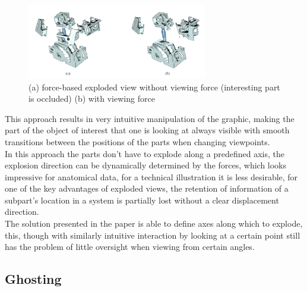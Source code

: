 \begin{figure}[tb]
	\centering
	\includegraphics[width=0.7\textwidth]{chapters/figures/motor}
	\caption{(a) force-based exploded view without viewing force (interesting part is occluded) (b) with viewing force\cite{proc:bruckner-2006-EVV}}
	\label{fig:motor}
\end{figure}
This approach results in very intuitive manipulation of the graphic, making the part of the object of interest that one is looking at always visible with smooth transitions between the positions of the parts when changing viewpoints.\\
In this approach the parts don't have to explode along a predefined axis, the explosion direction can be dynamically determined by the forces, which looks impressive for anatomical data, for a technical illustration it is less desirable, for one of the key advantages of exploded views, the retention of information of a subpart's location in a system is partially lost without a clear displacement direction.\\
The solution presented in the paper is able to define axes along which to explode, this, though with similarly intuitive interaction by looking at a certain point still has the problem of little oversight when viewing from certain angles.
\subsection{Ghosting}


